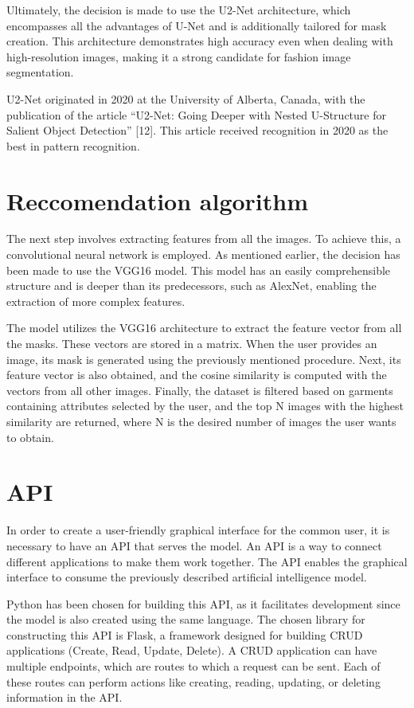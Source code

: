 \documentclass[12pt]{report} %
\begin{document}
Ultimately, the decision is made to use the U2-Net architecture, which encompasses all the advantages of U-Net and is additionally tailored for mask creation. This architecture demonstrates high accuracy even when dealing with high-resolution images, making it a strong candidate for fashion image segmentation.

U2-Net originated in 2020 at the University of Alberta, Canada, with the publication of the article ``U2-Net: Going Deeper with Nested U-Structure for Salient Object Detection'' [12]. This article received recognition in 2020 as the best in pattern recognition.

\section*{Reccomendation algorithm}
The next step involves extracting features from all the images. To achieve this, a convolutional neural network is employed. As mentioned earlier, the decision has been made to use the VGG16 model. This model has an easily comprehensible structure and is deeper than its predecessors, such as AlexNet, enabling the extraction of more complex features.

The model utilizes the VGG16 architecture to extract the feature vector from all the masks. These vectors are stored in a matrix. When the user provides an image, its mask is generated using the previously mentioned procedure. Next, its feature vector is also obtained, and the cosine similarity is computed with the vectors from all other images. Finally, the dataset is filtered based on garments containing attributes selected by the user, and the top N images with the highest similarity are returned, where N is the desired number of images the user wants to obtain.

\section*{API}
In order to create a user-friendly graphical interface for the common user, it is necessary to have an API that serves the model. An API is a way to connect different applications to make them work together. The API enables the graphical interface to consume the previously described artificial intelligence model.

Python has been chosen for building this API, as it facilitates development since the model is also created using the same language. The chosen library for constructing this API is Flask, a framework designed for building CRUD applications (Create, Read, Update, Delete). A CRUD application can have multiple endpoints, which are routes to which a request can be sent. Each of these routes can perform actions like creating, reading, updating, or deleting information in the API.
\end{document}
